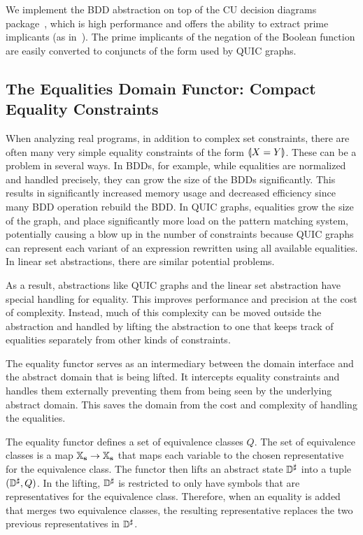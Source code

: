 We implement the BDD abstraction on top of the CU decision diagrams package~\cite{cudd}, which is high performance and offers the ability to extract prime implicants (as in~\cite{prime:mit:92}).  The prime implicants of the negation of the Boolean function are easily converted to conjuncts of the form used by QUIC graphs.

\subsection{The Equalities Domain Functor: Compact Equality Constraints}
\label{s:4:4:eqs}
\newcommand{\eqrep}{\ensuremath{Q}}

When analyzing real programs, in addition to complex set constraints, there are often many very simple equality constraints of the form $\llparenthesis X = Y \rrparenthesis$.  These can be a problem in several ways.  In BDDs, for example, while equalities are normalized and handled precisely, they can grow the size of the BDDs significantly.  This results in significantly increased memory usage and decreased efficiency since many BDD operation rebuild the BDD.  In QUIC graphs, equalities grow the size of the graph, and place significantly more load on the pattern matching system, potentially causing a blow up in the number of constraints because QUIC graphs can represent each variant of an expression rewritten using all available equalities.  In linear set abstractions, there are similar potential problems.

As a result, abstractions like QUIC graphs and the linear set abstraction have special handling for equality.  This improves performance and precision at the cost of complexity.  Instead, much of this complexity can be moved outside the abstraction and handled by lifting the abstraction to one that keeps track of equalities separately from other kinds of constraints.

The equality functor serves as an intermediary between the domain interface and the abstract domain that is being lifted.  It intercepts equality constraints and handles them externally preventing them from being seen by the underlying abstract domain.  This saves the domain from the cost and complexity of handling the equalities.

The equality functor defines a set of equivalence classes $\eqrep$.  The set of equivalence classes is a map $\mathbb{X}_{\bf s} \rightarrow \mathbb{X}_{\bf s}$ that maps each variable to the chosen representative for the equivalence class.  The functor then lifts an abstract state ${\mathbb{D}}^{\sharp}$ into a tuple $(\adom, \eqrep)$.  In the lifting, ${\mathbb{D}}^{\sharp}$ is restricted to only have symbols that are representatives for the equivalence class.  Therefore, when an equality is added that merges two equivalence classes, the resulting representative replaces the two previous representatives in ${\mathbb{D}}^{\sharp}$.

